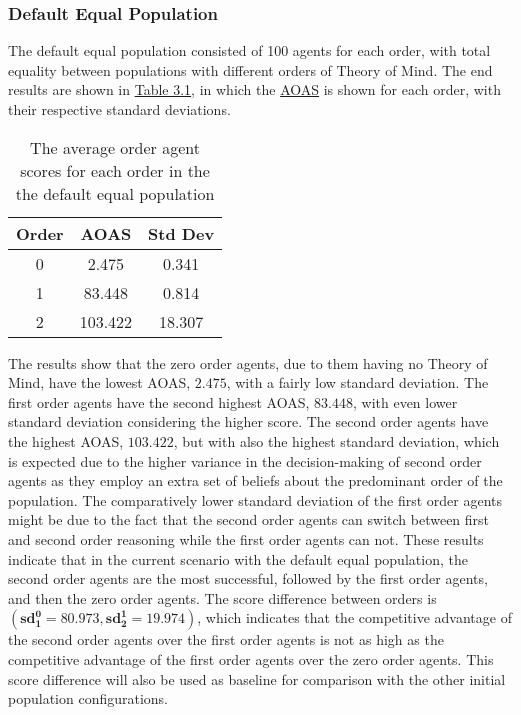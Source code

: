 \subsubsection{Default Equal Population}

The default equal population consisted of 100 agents for each order, with total equality between populations with different orders of Theory of Mind. The end results are shown in \hyperref[table:non-sig-default-equal-simple]{Table 3.1}, in which the \hyperref[eq:aoas]{AOAS} is shown for each order, with their respective standard deviations. 

\begin{table}[h]
\centering
\begin{tabular}{|c|c|c|}
\hline
Order & AOAS & Std Dev \\ \hline
0     & 2.475 & 0.341   \\
1     & 83.448 & 0.814  \\
2     & 103.422 & 18.307 \\ \hline
\end{tabular}
\caption{The average order agent scores for each order in the the default equal population}
\label{table:non-sig-default-equal-simple}
\end{table}

The results show that the zero order agents, due to them having no Theory of Mind, have the lowest AOAS, $\mathbf{2.475}$, with a fairly low standard deviation. The first order agents have the second highest AOAS, $\mathbf{83.448}$, with even lower standard deviation considering the higher score. The second order agents have the highest AOAS, $\mathbf{103.422}$, but with also the highest standard deviation, which is expected due to the higher variance in the decision-making of second order agents as they employ an extra set of beliefs about the predominant order of the population. The comparatively lower standard deviation of the first order agents might be due to the fact that the second order agents can switch between first and second order reasoning while the first order agents can not. These results indicate that in the current scenario with the default equal population, the second order agents are the most successful, followed by the first order agents, and then the zero order agents. The score difference between orders is $(\mathbf{sd^0_1 = 80.973}, \mathbf{sd^1_2 = 19.974})$, which indicates that the competitive advantage of the second order agents over the first order agents is not as high as the competitive advantage of the first order agents over the zero order agents. This score difference will also be used as baseline for comparison with the other initial population configurations.

